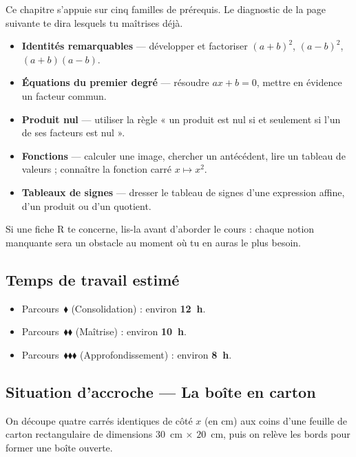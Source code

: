 Ce chapitre s'appuie sur cinq familles de prérequis. Le diagnostic de la page suivante te dira lesquels tu maîtrises déjà.

\begin{itemize}
  \item[\textbf{R1}] \textbf{Identités remarquables} — développer et factoriser $(a+b)^2$, $(a-b)^2$, $(a+b)(a-b)$.
  \item[\textbf{R2}] \textbf{Équations du premier degré} — résoudre $ax + b = 0$, mettre en évidence un facteur commun.
  \item[\textbf{R3}] \textbf{Produit nul} — utiliser la règle « un produit est nul si et seulement si l'un de ses facteurs est nul ».
  \item[\textbf{R4}] \textbf{Fonctions} — calculer une image, chercher un antécédent, lire un tableau de valeurs ; connaître la fonction carré $x \mapsto x^2$.
  \item[\textbf{R5}] \textbf{Tableaux de signes} — dresser le tableau de signes d'une expression affine, d'un produit ou d'un quotient.
\end{itemize}

Si une fiche R te concerne, lis-la avant d'aborder le cours : chaque notion manquante sera un obstacle au moment où tu en auras le plus besoin.

\subsection*{Temps de travail estimé}

\begin{itemize}
  \item Parcours~$\blacklozenge$ (Consolidation) : environ \textbf{12~h}.
  \item Parcours~$\blacklozenge\blacklozenge$ (Maîtrise) : environ \textbf{10~h}.
  \item Parcours~$\blacklozenge\blacklozenge\blacklozenge$ (Approfondissement) : environ \textbf{8~h}.
\end{itemize}

\subsection*{Situation d'accroche — La boîte en carton}

On découpe quatre carrés identiques de côté $x$ (en cm) aux coins d'une feuille de carton rectangulaire de dimensions $30$~cm $\times$ $20$~cm, puis on relève les bords pour former une boîte ouverte.

